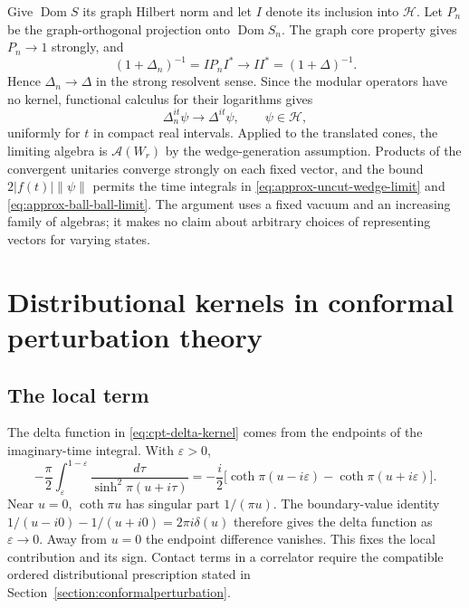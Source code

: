 \documentclass[a4paper,11pt]{article}
\theoremstyle{definition}
\begin{document}
Give $\operatorname{Dom}S$ its graph Hilbert norm and let $I$ denote its inclusion into $\mathcal H$. Let $P_n$ be the graph-orthogonal projection onto $\operatorname{Dom}S_n$. The graph core property gives $P_n\to1$ strongly, and
\begin{equation}
 (1+\Delta_n)^{-1}=IP_nI^*\longrightarrow II^*=(1+\Delta)^{-1}.
 \label{eq:appA-resolvent}
\end{equation}
Hence $\Delta_n\to\Delta$ in the strong resolvent sense. Since the modular operators have no kernel, functional calculus for their logarithms gives
\begin{equation}
 \Delta_n^{it}\psi\longrightarrow\Delta^{it}\psi,\qquad\psi\in\mathcal H,
 \label{eq:appA-unitary}
\end{equation}
uniformly for $t$ in compact real intervals. Applied to the translated cones, the limiting algebra is $\mathcal A(W_r)$ by the wedge-generation assumption. Products of the convergent unitaries converge strongly on each fixed vector, and the bound $2|f(t)|\|\psi\|$ permits the time integrals in \eqref{eq:approx-uncut-wedge-limit} and \eqref{eq:approx-ball-ball-limit}. The argument uses a fixed vacuum and an increasing family of algebras; it makes no claim about arbitrary choices of representing vectors for varying states.

\section{Distributional kernels in conformal perturbation theory}\label{app:kernels}

\subsection{The local term}

The delta function in \eqref{eq:cpt-delta-kernel} comes from the endpoints of the imaginary-time integral. With $\varepsilon>0$,
\begin{equation}
 -\frac\pi2\int_\varepsilon^{1-\varepsilon}\frac{d\tau}{\sinh^2\pi(u+i\tau)}
 =-\frac i2\bigl[\coth\pi(u-i\varepsilon)-\coth\pi(u+i\varepsilon)\bigr].
 \label{eq:appB-local}
\end{equation}
Near $u=0$, $\coth\pi u$ has singular part $1/(\pi u)$. The boundary-value identity $1/(u-i0)-1/(u+i0)=2\pi i\delta(u)$ therefore gives the delta function as $\varepsilon\to0$. Away from $u=0$ the endpoint difference vanishes. This fixes the local contribution and its sign. Contact terms in a correlator require the compatible ordered distributional prescription stated in Section~\ref{section:conformalperturbation}.
\end{document}
